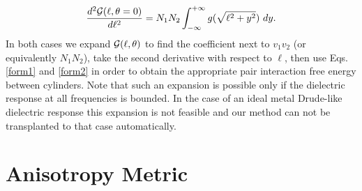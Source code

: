 \documentclass[onecolumn,letterpaper,amsmath,amssymb,floatfix,aps,superscriptaddress]{revtex4}
\begin{document}
\begin{equation}
\frac{d^{2}{\cal G}(\ell,\theta=0)}{d\ell^{2}}=N_1 N_2\int_{-\infty}^{+\infty}g(\sqrt{\ell^{2}+y^{2}})~dy.
\label{form2}
\end{equation}
In both cases we expand ${\cal G}(\ell,\theta)$ to find the coefficient next to $v_1 v_2$ (or equivalently $N_1 N_2$), take the second derivative with respect to $\ell$, then use Eqs. \ref{form1} and \ref{form2} in order to obtain the appropriate pair interaction free energy between cylinders. Note that such an expansion is possible only if the dielectric response at all frequencies is bounded. In the case of an ideal metal Drude-like dielectric response this expansion is not feasible and our method can not be transplanted to that case automatically.


\section{Anisotropy Metric}
\end{document}

